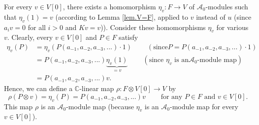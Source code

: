 \documentclass[etingof-lie.tex]{subfiles}
\begin{document}
For every $v\in V\left[  0\right]  $, there exists a homomorphism $\eta
_{v}:F\rightarrow V$ of $\mathcal{A}_{0}$-modules such that $\eta_{v}\left(
1\right)  =v$ (according to Lemma \ref{lem.V=F}, applied to $v$ instead of $u$
(since $a_{i}v=0$ for all $i>0$ and $Kv=v$)). Consider these homomorphisms
$\eta_{v}$ for various $v$. Clearly, every $v\in V\left[  0\right]  $ and
$P\in F$ satisfy%
\begin{align*}
\eta_{v}\left(  P\right)   &  =\eta_{v}\left(  P\left(  a_{-1},a_{-2}%
,a_{-3},...\right)  \cdot1\right)  \ \ \ \ \ \ \ \ \ \ \left(  \text{since
}P=P\left(  a_{-1},a_{-2},a_{-3},...\right)  \cdot1\right) \\
&  =P\left(  a_{-1},a_{-2},a_{-3},...\right)  \underbrace{\eta_{v}\left(
1\right)  }_{=v}\ \ \ \ \ \ \ \ \ \ \left(  \text{since }\eta_{v}\text{ is an
}\mathcal{A}_{0}\text{-module map}\right) \\
&  =P\left(  a_{-1},a_{-2},a_{-3},...\right)  v.
\end{align*}
Hence, we can define a $\mathbb{C}$-linear map $\rho:F\otimes V\left[
0\right]  \rightarrow V$ by%
\[
\rho\left(  P\otimes v\right)  =\eta_{v}\left(  P\right)  =P\left(
a_{-1},a_{-2},a_{-3},...\right)  v\ \ \ \ \ \ \ \ \ \ \text{for any }P\in
F\text{ and }v\in V\left[  0\right]  .
\]
This map $\rho$ is an $\mathcal{A}_{0}$-module map (because $\eta_{v}$ is an
$\mathcal{A}_{0}$-module map for every $v\in V\left[  0\right]  $).
\end{document}
